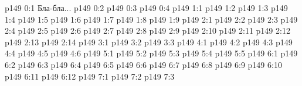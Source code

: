 \author{Промежуточные создания}
\vs p149 0:1  Бла-бла...
\vs p149 0:2 
\vs p149 0:3 
\vs p149 0:4 \pc 
{}
\vs p149 1:1 
\vs p149 1:2 
\vs p149 1:3 \pc 
\vs p149 1:4 
\vs p149 1:5 
\vs p149 1:6 
\vs p149 1:7 
\vs p149 1:8 \pc 
\vs p149 1:9 
\vs p149 2:1 
\vs p149 2:2 
\vs p149 2:3 
\vs p149 2:4 
\vs p149 2:5 \pc 
\vs p149 2:6 \pc 
\vs p149 2:7 
\vs p149 2:8 \pc 
\vs p149 2:9 
\vs p149 2:10 \pc 
\vs p149 2:11 
\vs p149 2:12 \pc 
\vs p149 2:13 
\vs p149 2:14 
\vs p149 3:1 
\vs p149 3:2 
\vs p149 3:3 
\vs p149 4:1 
\vs p149 4:2 \pc 
\vs p149 4:3 \pc 
\vs p149 4:4 
\vs p149 4:5 
\vs p149 4:6 
\vs p149 5:1 
\vs p149 5:2 \pc 
\vs p149 5:3 
\vs p149 5:4 
\vs p149 5:5 \pc 
{}
\vs p149 6:1 
\vs p149 6:2 \pc 
\vs p149 6:3 
\vs p149 6:4 
\vs p149 6:5 
\vs p149 6:6 
\vs p149 6:7 
\vs p149 6:8 
\vs p149 6:9 
\vs p149 6:10 
\vs p149 6:11 
\vs p149 6:12 
\vs p149 7:1 
\vs p149 7:2 
\vs p149 7:3 
\quizlink
